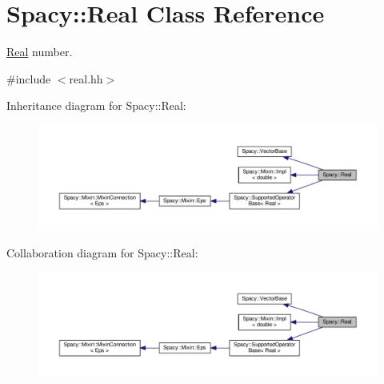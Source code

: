 \hypertarget{classSpacy_1_1Real}{}\section{Spacy\+:\+:Real Class Reference}
\label{classSpacy_1_1Real}


\hyperlink{classSpacy_1_1Real}{Real} number.  




{\ttfamily \#include $<$real.\+hh$>$}



Inheritance diagram for Spacy\+:\+:Real\+:\nopagebreak
\begin{figure}[H]
\begin{center}
\leavevmode
\includegraphics[width=350pt]{classSpacy_1_1Real__inherit__graph}
\end{center}
\end{figure}


Collaboration diagram for Spacy\+:\+:Real\+:\nopagebreak
\begin{figure}[H]
\begin{center}
\leavevmode
\includegraphics[width=350pt]{classSpacy_1_1Real__coll__graph}
\end{center}
\end{figure}
